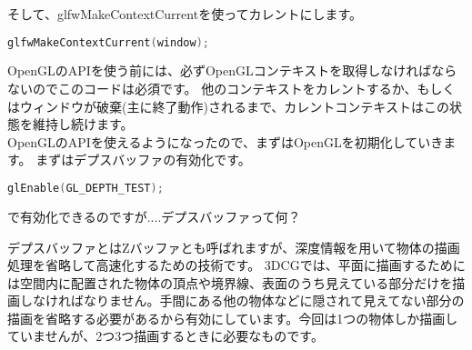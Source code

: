 \documentclass[a4paper,titlepage]{jsarticle}
\begin{document}
そして、glfwMakeContextCurrentを使ってカレントにします。
\begin{lstlisting}[language=C++]
glfwMakeContextCurrent(window);
\end{lstlisting}
OpenGLのAPIを使う前には、必ずOpenGLコンテキストを取得しなければならないのでこのコードは必須です。
他のコンテキストをカレントするか、もしくはウィンドウが破棄(主に終了動作)されるまで、カレントコンテキストはこの状態を維持し続けます。\\
OpenGLのAPIを使えるようになったので、まずはOpenGLを初期化していきます。
まずはデプスバッファの有効化です。
\begin{lstlisting}[language=C++]
glEnable(GL_DEPTH_TEST);
\end{lstlisting}
で有効化できるのですが....デプスバッファって何？

デプスバッファとはZバッファとも呼ばれますが、深度情報を用いて物体の描画処理を省略して高速化するための技術です。
3DCGでは、平面に描画するためには空間内に配置された物体の頂点や境界線、表面のうち見えている部分だけを描画しなければなりません。手間にある他の物体などに隠されて見えてない部分の描画を省略する必要があるから有効にしています。今回は1つの物体しか描画していませんが、2つ3つ描画するときに必要なものです。
\end{document}
